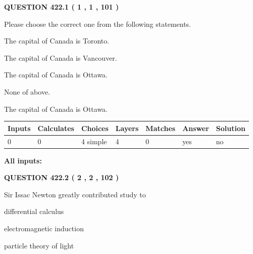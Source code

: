 \documentclass[12pt]{article}
\begin{document}
{\textbf{\Large{QUESTION
422.1 
 ( 1 , 1 , 101 )
}}}
  
  
Please choose the correct one from the following statements.
 
 
The capital of Canada is Toronto.
 
 
The capital of Canada is Vancouver.
 
 
The capital of Canada is Ottawa.
 
 
 None of above.
 
 
\noindent{}
 
 
The capital of Canada is Ottawa.
 
 
\noindent{}
 
 
   
   
   
   
\noindent\begin{tabular}{|l|l|l|l|l|l|l|}
 \hline
Inputs & Calculates & Choices & Layers & Matches & Answer & Solution \\ \hline
 0  & 
 0  & 
 4
  simple  
  & 
 4  & 
 0  & 
  yes & 
  no 
  \\ \hline
 \end{tabular}
   
   
   
   
\noindent{}
   
   
   
   
\noindent\vspace{0.1in}\hspace{-0.08in} {\textbf{\Large{All inputs: }}}
   
   
  
\vspace{0.2in}
  
{\textbf{\Large{QUESTION
422.2 
 ( 2 , 2 , 102 )
}}}
  
  
Sir Issac Newton greatly contributed study to
 
 
differential calculus
 
 
electromagnetic induction
 
 
particle theory of light
 
\end{document}
